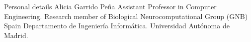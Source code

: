 \begin{rubric}{Personal details}
Alicia Garrido Peña
Assistant Professor in Computer Engineering. Research member of Biological Neurocomputational Group (GNB)
Spain
Departamento de Ingeniería Informática. Universidad Autónoma de Madrid.

\end{rubric}